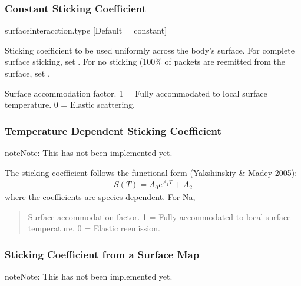 \documentclass[letterpaper,10pt,english]{sphinxmanual}
\begin{document}
\subsubsection{Constant Sticking Coefficient}
\label{\detokenize{nexoclom2/inputfiles:constant-sticking-coefficient}}\label{\detokenize{nexoclom2/inputfiles:constantsticking}}
\sphinxAtStartPar
surfaceinteracction.type {[}Default = constant{]}
\begin{description}
\sphinxAtStartPar
Sticking coefficient to be used uniformly across the body’s surface.
For complete surface sticking, set .
For no sticking (100\% of packets are reemitted from the surface, set
.

\sphinxAtStartPar
Surface accommodation factor. 1 = Fully accommodated to local surface
temperature. 0 = Elastic scattering.

\end{description}


\subsubsection{Temperature Dependent Sticking Coefficient}
\label{\detokenize{nexoclom2/inputfiles:temperature-dependent-sticking-coefficient}}\label{\detokenize{nexoclom2/inputfiles:tempdependsticking}}
\begin{sphinxadmonition}{note}{Note:}
\sphinxAtStartPar
This has not been implemented yet.
\end{sphinxadmonition}

\sphinxAtStartPar
The sticking coefficient follows the functional form (Yakshinskiy \& Madey 2005):
\begin{equation*}
\begin{split}S(T) = A_0 e^{A_1 T} + A_2\end{split}
\end{equation*}
\sphinxAtStartPar
where the coefficients are species dependent. For Na,
\begin{quote}

\sphinxAtStartPar
Surface accommodation factor. 1 = Fully accommodated to local surface
temperature. 0 = Elastic reemission.
\end{quote}


\subsubsection{Sticking Coefficient from a Surface Map}
\label{\detokenize{nexoclom2/inputfiles:sticking-coefficient-from-a-surface-map}}\label{\detokenize{nexoclom2/inputfiles:surfacemapsticking}}
\begin{sphinxadmonition}{note}{Note:}
\sphinxAtStartPar
This has not been implemented yet.
\end{sphinxadmonition}
\end{document}
